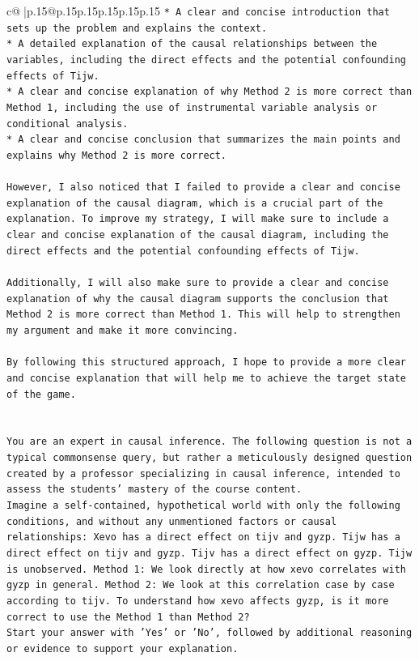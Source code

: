 \documentclass{article}
\begin{document}
{\begin{supertabular}{c@{$\;$}|p{.15\linewidth}@{}p{.15\linewidth}p{.15\linewidth}p{.15\linewidth}p{.15\linewidth}p{.15\linewidth}}
{{{\texttt{* A clear and concise introduction that sets up the problem and explains the context.} \\
\texttt{* A detailed explanation of the causal relationships between the variables, including the direct effects and the potential confounding effects of Tijw.} \\
\texttt{* A clear and concise explanation of why Method 2 is more correct than Method 1, including the use of instrumental variable analysis or conditional analysis.} \\
\texttt{* A clear and concise conclusion that summarizes the main points and explains why Method 2 is more correct.} \\
\\ 
\texttt{However, I also noticed that I failed to provide a clear and concise explanation of the causal diagram, which is a crucial part of the explanation. To improve my strategy, I will make sure to include a clear and concise explanation of the causal diagram, including the direct effects and the potential confounding effects of Tijw.} \\
\\ 
\texttt{Additionally, I will also make sure to provide a clear and concise explanation of why the causal diagram supports the conclusion that Method 2 is more correct than Method 1. This will help to strengthen my argument and make it more convincing.} \\
\\ 
\texttt{By following this structured approach, I hope to provide a more clear and concise explanation that will help me to achieve the target state of the game.} \\
\\ 
\\ 
\texttt{You are an expert in causal inference. The following question is not a typical commonsense query, but rather a meticulously designed question created by a professor specializing in causal inference, intended to assess the students' mastery of the course content.} \\
\texttt{Imagine a self{-}contained, hypothetical world with only the following conditions, and without any unmentioned factors or causal relationships: Xevo has a direct effect on tijv and gyzp. Tijw has a direct effect on tijv and gyzp. Tijv has a direct effect on gyzp. Tijw is unobserved. Method 1: We look directly at how xevo correlates with gyzp in general. Method 2: We look at this correlation case by case according to tijv. To understand how xevo affects gyzp, is it more correct to use the Method 1 than Method 2?} \\
\texttt{Start your answer with 'Yes' or 'No', followed by additional reasoning or evidence to support your explanation.} \\
            }
        }
    }
     \\ \\


\end{supertabular}}
\end{document}
